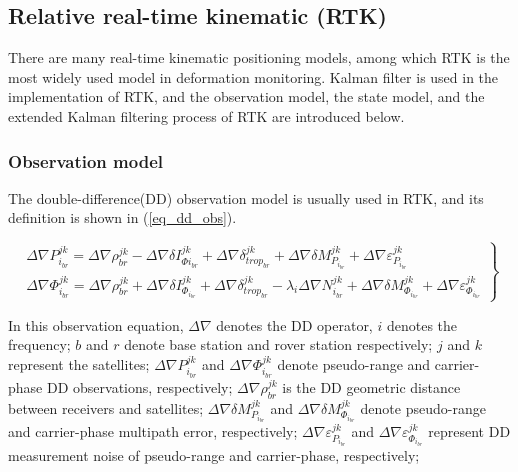 \documentclass[journal]{IEEEtran}
\begin{document}
\subsection{Relative real-time kinematic (RTK)}
There are many real-time kinematic positioning models, among which RTK is the most widely used model in deformation monitoring.
Kalman filter is used in the implementation of  RTK, and the observation model, the state model, and the extended Kalman filtering process of RTK are introduced below. 
\subsubsection{Observation model}
The double-difference(DD) observation model is usually used in RTK, and its definition is shown in (\ref{eq_dd_obs})\cite{teunissen2017springer}.
\begin{figure*}
	\begin{equation}
	\left. \begin{array}{l}
	\Delta \nabla P_{{i_{br}}}^{jk} = \Delta \nabla \rho _{br}^{jk} - \Delta \nabla \delta I_{\Phi {i_{br}}}^{jk} + \Delta \nabla \delta _{tro{p_{br}}}^{jk} + \Delta \nabla \delta M_{{P_{{i_{br}}}}}^{jk} + \Delta \nabla \varepsilon _{{P_{{i_{br}}}}}^{jk}\\
	\Delta \nabla \Phi _{{i_{br}}}^{jk} = \Delta \nabla \rho _{br}^{jk} + \Delta \nabla \delta I_{{\Phi _{{i_{br}}}}}^{jk} + \Delta \nabla \delta _{tro{p_{br}}}^{jk} - {\lambda _i}\Delta \nabla N_{{i_{br}}}^{jk} + \Delta \nabla \delta M_{{\Phi _{{i_{br}}}}}^{jk} + \Delta \nabla \varepsilon _{{\Phi _{{i_{br}}}}}^{jk}
	\end{array} \right\}
	\label{eq_dd_obs}
	\end{equation}
\end{figure*}
In this observation equation, $\Delta \nabla $ denotes the DD operator, $i$ denotes the frequency; $b$ and $r$ denote base station and rover station respectively; $j$ and $k$ represent the satellites;
$\Delta \nabla P_{{{i}_{br}}}^{jk}$ and $\Delta \nabla \Phi _{{{i}_{br}}}^{jk}$ denote pseudo-range and carrier-phase DD observations, respectively; 
$\Delta \nabla \rho _{br}^{jk}$ is the DD geometric distance between receivers and satellites; 
$\Delta \nabla \delta M_{{{P}_{{{i}_{br}}}}}^{jk}$ and $\Delta \nabla \delta M_{{{\Phi }_{{{i}_{br}}}}}^{jk}$ denote pseudo-range and carrier-phase multipath error, respectively; 
$\Delta \nabla \varepsilon _{{{P}_{{{i}_{br}}}}}^{jk}$ and $\Delta \nabla \varepsilon _{{{\Phi }_{{{i}_{br}}}}}^{jk}$ represent DD measurement noise of pseudo-range and carrier-phase, respectively; 
\end{document}
